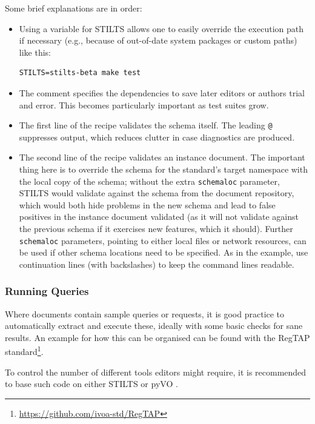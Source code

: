 \documentclass[11pt,a4paper]{ivoa}
\begin{document}
Some brief explanations are in order:

\begin{itemize}
\item Using a variable for STILTS allows one to easily override the
execution path if necessary (e.g., because of out-of-date system
packages or custom paths) like this:

\begin{lstlisting}
STILTS=stilts-beta make test
\end{lstlisting}

\item The comment specifies the dependencies to save later editors or
authors trial and error.  This becomes particularly important as test
suites grow.

\item The first line of the recipe validates the schema itself.  The
leading \verb|@| suppresses output, which reduces clutter in case
diagnostics are produced.

\item The second line of the recipe validates an instance document.  The
important thing here is to override the schema for the standard's target
namespace with the local copy of the schema; without the extra
\verb|schemaloc| parameter, STILTS would validate against the schema
from the document repository, which would both hide problems in the new
schema and lead to false positives in the instance document validated
(as it will not validate against the previous schema if it exercises new
features, which it should).  Further \verb|schemaloc| parameters,
pointing to either local files or network resources,
can be used if other schema locations need to be specified.
As in the example, use continuation lines (with backslashes)
to keep the command lines readable.

\end{itemize}

\subsubsection{Running Queries}

Where documents contain sample queries or requests, it is good practice
to automatically extract and execute these, ideally with some basic
checks for sane results.  An example for how this can be organised can
be found with the RegTAP
standard\footnote{\url{https://github.com/ivoa-std/RegTAP}}.  

To control the number of different tools editors might require, it
is recommended to base such code on either STILTS or pyVO
\citep{2014ascl.soft02004G}.
\end{document}
